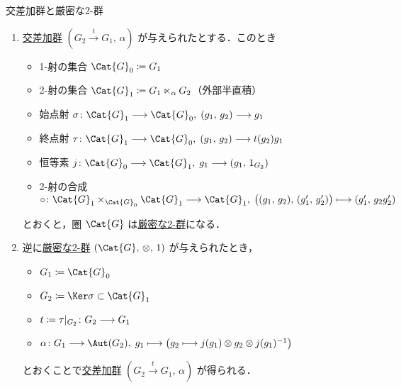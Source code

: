\documentclass[TQFT_main]{subfiles}
\begin{document}
\begin{myprop}[label=prop:crossed-S2G]{交差加群と厳密な2-群}
    \begin{enumerate}
        \item \hyperref[def:crossed-module]{交差加群} $(G_2 \xrightarrow{t} G_1,\, \alpha)$ が与えられたとする．このとき
        \begin{itemize}
            \item 1-射の集合 $\Cat{G}_0 \coloneqq G_1$
            \item 2-射の集合 $\Cat{G}_1 \coloneqq G_1\ltimes_\alpha G_2$（外部半直積）
            \item 始点射 $\sigma \colon \Cat{G}_1 \lto \Cat{G}_0,\; (g_1,\, g_2) \lto g_1$
            \item 終点射 $\tau \colon \Cat{G}_1 \lto \Cat{G}_0,\; (g_1,\, g_2) \lto t(g_2)g_1$
            \item 恒等素 $j \colon \Cat{G}_0 \lto \Cat{G}_1,\; g_1 \lto (g_1,\, 1_{G_2})$
            \item 2-射の合成 $\circ \colon \Cat{G}_1 \times_{\Cat{G}_0} \Cat{G}_1 \lto \Cat{G}_1,\; \bigl((g_1,\, g_2),\, (g'_1,\, g'_2)\bigr) \lmto (g'_1,\, g_2g'_2)$
        \end{itemize}
        とおくと，圏 $\Cat{G}$ は\hyperref[def:W2G-C2G]{厳密な2-群}になる．
        \item 逆に\hyperref[def:W2G-C2G]{厳密な2-群} $(\Cat{G},\, \otimes,\, 1)$ が与えられたとき，
        \begin{itemize}
            \item $G_1 \coloneqq \Cat{G}_0$
            \item $G_2 \coloneqq \Ker \sigma \subset \Cat{G}_1$
            \item $t \coloneqq \tau|_{G_2} \colon G_2 \longrightarrow G_1$
            \item $\alpha \colon G_1 \lto \Aut (G_2),\; g_1 \lmto \bigl( g_2 \lmto j(g_1) \otimes g_2 \otimes j(g_1)^{-1} \bigr)$
        \end{itemize}
        とおくことで\hyperref[def:crossed-module]{交差加群} $(G_2 \xrightarrow{t} G_1,\, \alpha)$ が得られる．
    \end{enumerate}
    
\end{myprop}
\end{document}
